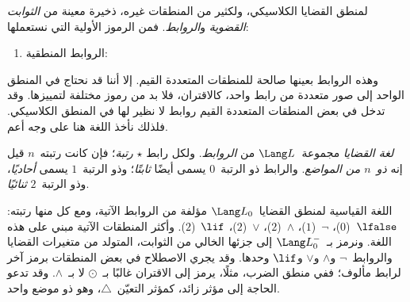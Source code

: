 \documentclass[../../../include/open-logic-section]{subfiles}
\begin{document}


لمنطق القضايا الكلاسيكي، ولكثير من المنطقات غيره، ذخيرة معينة من
\emph{الثوابت القضوية} و\emph{الروابط}. فمن الرموز الأولية التي
نستعملها:
\begin{enumerate}
\item الروابط المنطقية:
  \startycommalist
\end{enumerate}

وهذه الروابط بعينها صالحة للمنطقات المتعددة القيم. إلا أننا قد نحتاج
في المنطق الواحد إلى صور متعددة من رابط واحد، كالاقتران، فلا بد من
رموز مختلفة لتمييزها. وقد تدخل في بعض المنطقات المتعددة القيم روابط
لا نظير لها في المنطق الكلاسيكي. فلذلك نأخذ اللغة هنا على وجه أعم.

\begin{defn}
  \emph{لغة القضايا} مجموعة~$\Lang L$ من \emph{الروابط}. ولكل رابط
  $\star$ \emph{رتبة}؛ فإن كانت رتبته~$n$ قيل إنه \emph{ذو~$n$ من
  المواضع}. والرابط ذو الرتبة~$0$ يسمى أيضًا \emph{ثابتًا}؛ وذو
  الرتبة~$1$ يسمى \emph{أحاديًا}، وذو الرتبة~$2$ \emph{ثنائيًا}.
\end{defn}

\begin{ex}
  اللغة القياسية لمنطق القضايا~$\Lang L_0$ مؤلفة من الروابط الآتية،
  ومع كل منها رتبته:
  $\lfalse$~($0$)،
  $\lnot$~($1$)،
  $\land$~($2$)،
  $\lor$~($2$)،
  $\lif$~($2$). وأكثر المنطقات الآتية مبني على هذه اللغة.
  ونرمز بـ~$\Lang L_0^{-}$ إلى جزئها الخالي من الثوابت، المتولد من
  متغيرات القضايا والروابط~$\lnot$ و$\land$ و$\lor$ و$\lif$ وحدها.
  وقد يجري الاصطلاح في بعض المنطقات برمز آخر لرابط مألوف؛ ففي منطق
  الضرب، مثلًا، يرمز إلى الاقتران غالبًا بـ~$\odot$ لا بـ~$\land$.
  وقد تدعو الحاجة إلى مؤثر زائد، كمؤثر التعيّن~$\triangle$، وهو ذو
  موضع واحد.
\end{ex}
\end{document}
